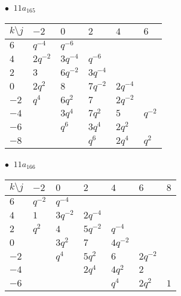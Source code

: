 \begin{minipage}{\linewidth}
$\bullet\ $ $11a_{165}$ \vspace{0.5em} \\
\begin{tabular}{l|lllll}
$k \setminus j$ & $-2$ & $0$ & $2$ & $4$ & $6$ \\
\hline
$6$ & $q^{-4}$ & $q^{-6}$ &  &  &  \\
$4$ & $2q^{-2}$ & $3q^{-4}$ & $q^{-6}$ &  &  \\
$2$ & $3$ & $6q^{-2}$ & $3q^{-4}$ &  &  \\
$0$ & $2q^{2}$ & $8$ & $7q^{-2}$ & $2q^{-4}$ &  \\
$-2$ & $q^{4}$ & $6q^{2}$ & $7$ & $2q^{-2}$ &  \\
$-4$ &  & $3q^{4}$ & $7q^{2}$ & $5$ & $q^{-2}$ \\
$-6$ &  & $q^{6}$ & $3q^{4}$ & $2q^{2}$ &  \\
$-8$ &  &  & $q^{6}$ & $2q^{4}$ & $q^{2}$ \\
\end{tabular}
\vspace{2em}
\end{minipage}
%
\begin{minipage}{\linewidth}
$\bullet\ $ $11a_{166}$ \vspace{0.5em} \\
\begin{tabular}{l|llllll}
$k \setminus j$ & $-2$ & $0$ & $2$ & $4$ & $6$ & $8$ \\
\hline
$6$ & $q^{-2}$ & $q^{-4}$ &  &  &  &  \\
$4$ & $1$ & $3q^{-2}$ & $2q^{-4}$ &  &  &  \\
$2$ & $q^{2}$ & $4$ & $5q^{-2}$ & $q^{-4}$ &  &  \\
$0$ &  & $3q^{2}$ & $7$ & $4q^{-2}$ &  &  \\
$-2$ &  & $q^{4}$ & $5q^{2}$ & $6$ & $2q^{-2}$ &  \\
$-4$ &  &  & $2q^{4}$ & $4q^{2}$ & $2$ &  \\
$-6$ &  &  &  & $q^{4}$ & $2q^{2}$ & $1$ \\
\end{tabular}
\vspace{2em}
\end{minipage}
%
